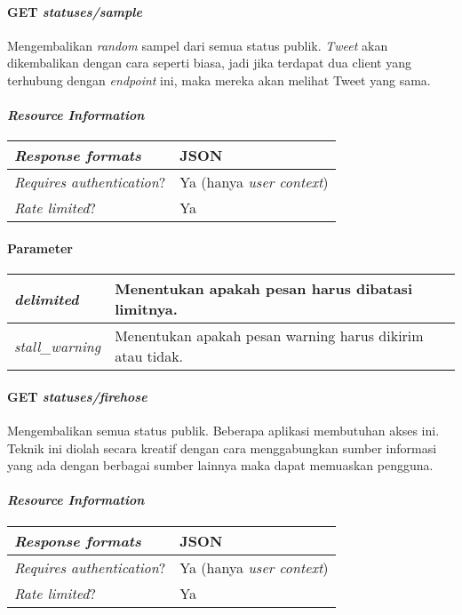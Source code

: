 \paragraph{GET \textit{statuses/sample}}
Mengembalikan \textit{random} sampel dari semua status publik. \textit{Tweet} akan dikembalikan dengan cara seperti biasa, jadi jika terdapat dua client yang terhubung dengan \textit{endpoint} ini, maka mereka akan melihat Tweet yang sama.

\paragraph{\textit{Resource Information}}
\begin{table}[h]
\begin{tabular}{|l|l|}
\hline
\textit{Response formats}         & JSON                    \\ \hline
\textit{Requires authentication}? & Ya (hanya \textit{user context}) \\ \hline
\textit{Rate limited}?            & Ya           \\ \hline         
\end{tabular}
\end{table}


\paragraph{Parameter}

\begin{table}[h]
\begin{tabular}{|l|l|}
\hline
\textit{delimited}          & Menentukan apakah pesan harus dibatasi limitnya. \\ \hline
\textit{stall\_warning}           & Menentukan apakah pesan warning harus dikirim atau tidak.                \\   \hline          
\end{tabular}
\end{table}


\paragraph{GET \textit{statuses/firehose}}
Mengembalikan semua status publik. Beberapa aplikasi membutuhan akses ini. Teknik ini diolah secara kreatif dengan cara menggabungkan sumber informasi yang ada dengan berbagai sumber lainnya maka dapat memuaskan pengguna.

\paragraph{\textit{Resource Information}}
\begin{table}[h]
\begin{tabular}{|l|l|}
\hline
\textit{Response formats}         & JSON                    \\ \hline
\textit{Requires authentication}? & Ya (hanya \textit{user context}) \\ \hline
\textit{Rate limited}?            & Ya                 \\ \hline   
\end{tabular}
\end{table}


